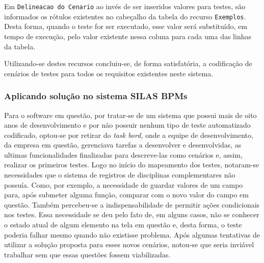 \documentclass[tg]{mdtufsm}
\begin{document}
Em \texttt{Delineacao do Cenario} ao invés de ser inseridos valores para testes, são informados os rótulos existentes no cabeçalho da tabela do recurso \texttt{Exemplos}. Desta forma, quando o teste for ser executado, esse valor será substituído, em tempo de execução, pelo valor existente nessa coluna para cada uma das linhas da tabela.

Utilizando-se destes recursos concluiu-se, de forma satisfatória, a codificação de cenários de testes para todos os requisitos existentes neste sistema.

\subsubsection{Aplicando solução no sistema SILAS BPMs}
Para o software em questão, por tratar-se de um sistema que possui mais de oito anos de desenvolvimento e por não possuir nenhum tipo de teste automatizado codificado, optou-se por retirar do \emph{task bord}, onde a equipe de desenvolvimento, da empresa em questão, gerenciava tarefas a desenvolver e desenvolvidas, as ultimas funcionalidades finalizadas para descreve-las como cenários e, assim, realizar os primeiros testes.
Logo no início do mapeamento dos testes, notaram-se necessidades que o sistema de registros de disciplinas complementares não possuía. Como, por exemplo, a necessidade de guardar valores de um campo para, após submeter alguma função, comparar com o novo valor do campo em questão. Também percebeu-se a indispensabilidade de permitir ações condicionais nos testes. Essa necessidade se deu pelo fato de, em alguns casos, não se conhecer o estado atual de algum elemento na tela em questão e, desta forma, o teste poderia falhar mesmo quando não existisse problema.
Após algumas tentativas de utilizar a solução proposta para esses novos cenários, notou-se que seria inviável trabalhar sem que essas questões fossem viabilizadas.
\end{document}
